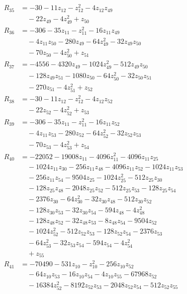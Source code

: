 \begin{align*}
R_{35} &= -30 -11z_{12} -z_{12}^{2} -4z_{12}z_{49} \\
&\quad -22z_{49} -4z_{49}^{2} +z_{50} \\
R_{36} &= -306 -35z_{11} -z_{11}^{2} -16z_{11}z_{49} \\
&\quad -4z_{11}z_{50} -280z_{49} -64z_{49}^{2} -32z_{49}z_{50} \\
&\quad -70z_{50} -4z_{50}^{2} +z_{51} \\
R_{37} &= -4556 -4320z_{49} -1024z_{49}^{2} -512z_{49}z_{50} \\
&\quad -128z_{49}z_{51} -1080z_{50} -64z_{50}^{2} -32z_{50}z_{51} \\
&\quad -270z_{51} -4z_{51}^{2} +z_{52} \\
R_{38} &= -30 -11z_{12} -z_{12}^{2} -4z_{12}z_{52} \\
&\quad -22z_{52} -4z_{52}^{2} +z_{53} \\
R_{39} &= -306 -35z_{11} -z_{11}^{2} -16z_{11}z_{52} \\
&\quad -4z_{11}z_{53} -280z_{52} -64z_{52}^{2} -32z_{52}z_{53} \\
&\quad -70z_{53} -4z_{53}^{2} +z_{54} \\
R_{40} &= -22052 -19008z_{11} -4096z_{11}^{2} -4096z_{11}z_{25} \\
&\quad -1024z_{11}z_{30} -256z_{11}z_{48} -4096z_{11}z_{52} -1024z_{11}z_{53} \\
&\quad -256z_{11}z_{54} -9504z_{25} -1024z_{25}^{2} -512z_{25}z_{30} \\
&\quad -128z_{25}z_{48} -2048z_{25}z_{52} -512z_{25}z_{53} -128z_{25}z_{54} \\
&\quad -2376z_{30} -64z_{30}^{2} -32z_{30}z_{48} -512z_{30}z_{52} \\
&\quad -128z_{30}z_{53} -32z_{30}z_{54} -594z_{48} -4z_{48}^{2} \\
&\quad -128z_{48}z_{52} -32z_{48}z_{53} -8z_{48}z_{54} -9504z_{52} \\
&\quad -1024z_{52}^{2} -512z_{52}z_{53} -128z_{52}z_{54} -2376z_{53} \\
&\quad -64z_{53}^{2} -32z_{53}z_{54} -594z_{54} -4z_{54}^{2} \\
&\quad +z_{55} \\
R_{41} &= -70490 -531z_{10} -z_{10}^{2} -256z_{10}z_{52} \\
&\quad -64z_{10}z_{53} -16z_{10}z_{54} -4z_{10}z_{55} -67968z_{52} \\
&\quad -16384z_{52}^{2} -8192z_{52}z_{53} -2048z_{52}z_{54} -512z_{52}z_{55} \\

\end{align*}
